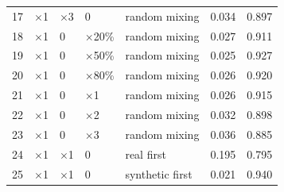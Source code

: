 \documentclass[letterpaper]{article} %
\begin{document}
\begin{table}[t]
{\begin{tabular}{lllllll}
			17& $\times$1 	 	& $\times$3   &0 			&random mixing &0.034 &0.897 \\	
			18& $\times$1 	 	&0 		&  $\times$20\%	 	&random mixing &0.027 &0.911 \\
			19& $\times$1 	 	&0 		&  $\times$50\% 	&random mixing &0.025 &0.927 \\
			20& $\times$1    	&0 		&  $\times$80\% 	&random mixing &0.026 &0.920 \\
			21& $\times$1 	 	&0 		&  $\times$1    &random mixing &0.026 &0.915 \\
			22& $\times$1 	 	&0 		&  $\times$2   &random mixing &0.032 &0.898 \\
			23& $\times$1 	 	&0 		&  $\times$3   &random mixing &0.036 &0.885 \\			
			24& $\times$1 	 	& $\times$1 	&0  		&real first &0.195 &0.795 \\
			25& $\times$1 	 	& $\times$1 	&0  		&synthetic first &0.021 &0.940 \\
			\bottomrule
		\end{tabular}
	}
	\label{availability_test}
\end{table}
\end{document}
